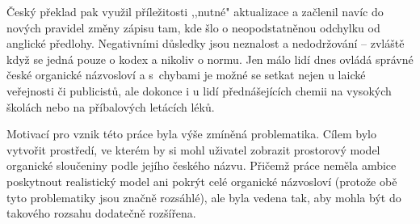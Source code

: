 Český překlad pak využil příležitosti ,,nutné" aktualizace a začlenil navíc do
nových pravidel změny zápisu tam, kde šlo o neopodstatněnou odchylku od anglické
předlohy. Negativními důsledky jsou neznalost a nedodržování -- zvláště když se
jedná pouze o kodex a nikoliv o normu. Jen málo lidí dnes ovládá správné české
organické názvosloví a s~chybami je možné se setkat nejen u laické veřejnosti či
publicistů, ale dokonce i u lidí přednášejících chemii na vysokých školách nebo
na příbalových letácích léků.

Motivací pro vznik této práce byla výše zmíněná problematika. Cílem bylo
vytvořit prostředí, ve kterém by si mohl uživatel zobrazit prostorový model
organické sloučeniny podle jejího českého názvu. Přičemž práce neměla ambice
poskytnout realistický model ani pokrýt celé organické názvosloví (protože obě
tyto problematiky jsou značně rozsáhlé), ale byla vedena tak, aby mohla být do
takového rozsahu dodatečně rozšířena.
